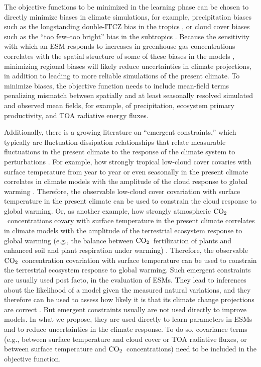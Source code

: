 \documentclass[draft]{agujournal}
\newcommand{\coo}{${\rm {CO}_{2}}$}
\begin{document}
The objective functions to be minimized in the learning phase can be chosen to directly minimize biases in climate simulations, for example, precipitation biases such as the longstanding double-ITCZ bias in the tropics  \citep{Lin07a,Li14a,Zhang15a,Adam16b,Adam17a}, or cloud cover biases such as the ``too few--too bright'' bias in the subtropics \citep{Webb01a,Zhang05b,Karlsson08a,Nam12a}. Because the sensitivity with which an ESM responds to increases in greenhouse gas concentrations correlates with the spatial structure of some of these biases in the models \citep[e.g.,][]{Tian15a,Siler17a}, minimizing regional biases will likely reduce uncertainties in climate projections, in addition to leading to more reliable simulations of the present climate. To minimize biases, the objective function needs to include mean-field terms penalizing mismatch between spatially and at least seasonally resolved simulated and observed mean fields, for example, of precipitation, ecosystem primary productivity, and TOA radiative energy fluxes. 

Additionally, there is a growing literature on ``emergent constraints,'' which typically are fluctuation-dissipation relationships that relate measurable fluctuations in the present climate to the response of the climate system to perturbations \citep{Hall06a,Collins12a,Klein15a}. For example, how strongly tropical low-cloud cover covaries with surface temperature from year to year or even seasonally in the present climate correlates in climate models with the amplitude of the cloud response to global warming  \citep{Qu14a,Qu15a,Brient16b}. Therefore, the observable low-cloud cover covariation with surface temperature in the present climate can be used to constrain the cloud response to global warming. Or, as another example, how strongly atmospheric \coo\ concentrations covary with surface temperature in the present climate correlates in climate models with the amplitude of the terrestrial ecosystem response to global warming (e.g., the balance between \coo\ fertilization of plants and enhanced soil and plant respiration under warming) \citep{Cox13a,Wenzel14a}. Therefore, the observable \coo\ concentration covariation with surface temperature can be used to constrain the terrestrial ecosystem response to global warming. Such emergent constraints are usually used post facto, in the evaluation of ESMs. They lead to inferences about the likelihood of a model given the measured natural variations, and they therefore can be used to assess how likely it is that its climate change projections are correct \citep[e.g.,][]{Brient16b}. But emergent constraints usually are not used directly to improve models. In what we propose, they are used directly to learn parameters in ESMs and to reduce uncertainties in the climate response. To do so, covariance terms (e.g., between surface temperature and cloud cover or TOA radiative fluxes, or between surface temperature and \coo\ concentrations) need to be included in the objective function. 
\end{document}
